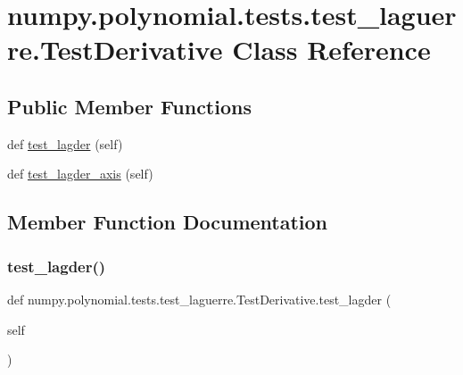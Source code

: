 \hypertarget{classnumpy_1_1polynomial_1_1tests_1_1test__laguerre_1_1TestDerivative}{}\section{numpy.\+polynomial.\+tests.\+test\+\_\+laguerre.\+Test\+Derivative Class Reference}
\label{classnumpy_1_1polynomial_1_1tests_1_1test__laguerre_1_1TestDerivative}
\subsection*{Public Member Functions}
\begin{DoxyCompactItemize}
\item 
def \hyperlink{classnumpy_1_1polynomial_1_1tests_1_1test__laguerre_1_1TestDerivative_a09a0d2437ac99d489469aed94a6fda87}{test\+\_\+lagder} (self)
\item 
def \hyperlink{classnumpy_1_1polynomial_1_1tests_1_1test__laguerre_1_1TestDerivative_abd482984e118123c049e5852225e9083}{test\+\_\+lagder\+\_\+axis} (self)
\end{DoxyCompactItemize}


\subsection{Member Function Documentation}
\mbox{\label{classnumpy_1_1polynomial_1_1tests_1_1test__laguerre_1_1TestDerivative_a09a0d2437ac99d489469aed94a6fda87}} 
\subsubsection{\texorpdfstring{test\+\_\+lagder()}{test\_lagder()}}
{\footnotesize\ttfamily def numpy.\+polynomial.\+tests.\+test\+\_\+laguerre.\+Test\+Derivative.\+test\+\_\+lagder (\begin{DoxyParamCaption}\item[{}]{self }\end{DoxyParamCaption})}

